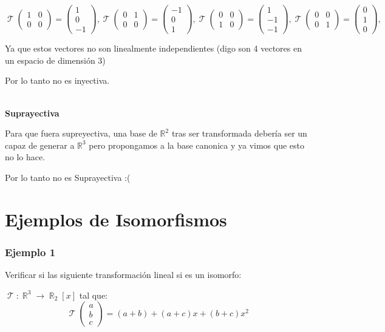 \documentclass[12pt]{report}                                    %
\DeclareMathOperator \Real {\mathbb{R}}                         %
\DeclareMathOperator \LinealTransformation {\mathcal{T}}        %
\newcommand{\pVector}[1]{                                       %
        \ensuremath{\begin{pmatrix}#1\end{pmatrix}}                 %
    }
\begin{document}
            \begin{equation*}
                \LinealTransformation \pVector{1&0\\0&0} = \pVector{1\\0\\-1}, 
                \LinealTransformation \pVector{0&1\\0&0} = \pVector{-1\\0\\1}, 
                \LinealTransformation \pVector{0&0\\1&0} = \pVector{1\\-1\\-1}, 
                \LinealTransformation \pVector{0&0\\0&1} = \pVector{0\\1\\0}, 
            \end{equation*}

            Ya que estos vectores no son linealmente independientes (digo son 4 vectores en un espacio de dimensión 3)

            Por lo tanto no es inyectiva.

            \textbf{\\Suprayectiva}

            Para que fuera supreyectiva, una base de $\mathbb{R}^2$ tras ser transformada debería ser un capaz de
            generar a $\mathbb{R}^3$ pero propongamos a la base canonica y ya vimos que esto no lo hace.

            Por lo tanto no es Suprayectiva :(




    \clearpage
    \section{Ejemplos de Isomorfismos}

            \subsubsection{\large Ejemplo 1}
            Verificar si las siguiente transformación lineal si es un isomorfo:

            $\LinealTransformation : \Real^3 \to \Real_2[x]$ tal que: 
            \begin{equation*}
            \LinealTransformation \pVector{a\\b\\c} = (a+b)+(a+c)x+(b+c)x^2
            \end{equation*}
\end{document}
